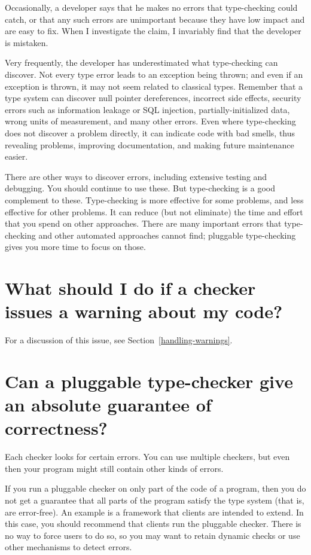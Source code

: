 Occasionally, a developer says that he makes no errors that type-checking
could catch, or that any such errors are unimportant because they have low
impact and are easy to fix.  When I investigate the claim, I invariably
find that the developer is mistaken.

Very frequently, the developer has underestimated what type-checking can
discover.  Not every type error leads to an exception being thrown; and
even if an exception is thrown, it may not seem related to classical types.
Remember that a type system can discover
null pointer dereferences,
incorrect side effects, 
security errors such as information leakage or SQL injection,
partially-initialized data,
wrong units of measurement,
and many other errors.  Even where type-checking does not discover a
problem directly, it can indicate code with bad smells, thus revealing
problems, improving documentation, and making future maintenance easier.

There are other ways to discover errors, including extensive testing and
debugging.  You should continue to use these.
But type-checking is a good complement to these.  Type-checking is more
effective for some problems, and less effective for other problems.  It can
reduce (but not eliminate) the time and effort that you spend on other
approaches.  There are many important errors that type-checking and other
automated approaches cannot find; pluggable type-checking gives you more
time to focus on those.


\section{What should I do if a checker issues a warning about my code?\label{faq-handling-warnings}}

For a discussion of this issue, see Section~\ref{handling-warnings}.


\section{Can a pluggable type-checker give an absolute guarantee of correctness?\label{faq-no-absolute-guarantee}}

Each checker looks for certain errors.  You can use multiple checkers, but
even then your program might still contain other kinds of errors.

If you run a pluggable checker on only part of the code of a program, then
you do not get a guarantee that all parts of the program satisfy the type
system (that is, are error-free).  An example is a framework that clients
are intended to extend.  In this case, you should recommend that clients
run the pluggable checker.  There is no way to force users to do so, so you
may want to retain dynamic checks or use other mechanisms to detect errors.

